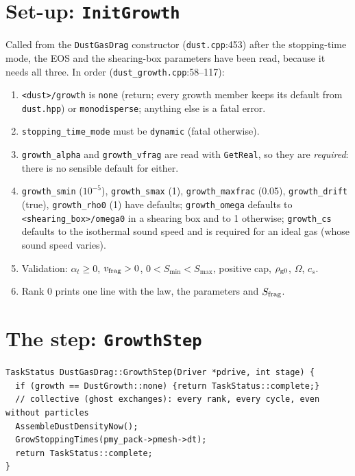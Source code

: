 \documentclass[11pt]{article}
\newcommand{\code}[1]{\texttt{#1}}
\newcommand{\file}[1]{\texttt{\small #1}}
\newcommand{\fn}[1]{\texttt{\small #1}}
\newcommand{\St}{S}
\newcommand{\vf}{v_{\rm frag}}
\begin{document}
\section{Set-up: \fn{InitGrowth}}\label{sec:init}
Called from the \code{DustGasDrag} constructor (\file{dust.cpp}:453) after the
stopping-time mode, the EOS and the shearing-box parameters have been read, because it
needs all three. In order (\file{dust\_growth.cpp}:58--117):
\begin{enumerate}
\item \code{<dust>/growth} is \code{none} (return; every growth member keeps its default
  from \file{dust.hpp}) or \code{monodisperse}; anything else is a fatal error.
\item \code{stopping\_time\_mode} must be \code{dynamic} (fatal otherwise).
\item \code{growth\_alpha} and \code{growth\_vfrag} are read with \fn{GetReal}, so they
  are \emph{required}: there is no sensible default for either.
\item \code{growth\_smin} ($10^{-5}$), \code{growth\_smax} (1), \code{growth\_maxfrac}
  (0.05), \code{growth\_drift} (true), \code{growth\_rho0} (1) have defaults;
  \code{growth\_omega} defaults to \code{<shearing\_box>/omega0} in a shearing box and to
  1 otherwise; \code{growth\_cs} defaults to the isothermal sound speed and is required
  for an ideal gas (whose sound speed varies).
\item Validation: $\alpha_t\ge0$, $\vf>0$, $0<\St_{\min}<\St_{\max}$, positive cap,
  $\rho_{\rm g0}$, $\Omega$, $c_s$.
\item Rank 0 prints one line with the law, the parameters and $\St_{\rm frag}$.
\end{enumerate}

\section{The step: \fn{GrowthStep}}\label{sec:step}
\begin{lstlisting}[firstnumber=125]
TaskStatus DustGasDrag::GrowthStep(Driver *pdrive, int stage) {
  if (growth == DustGrowth::none) {return TaskStatus::complete;}
  // collective (ghost exchanges): every rank, every cycle, even without particles
  AssembleDustDensityNow();
  GrowStoppingTimes(pmy_pack->pmesh->dt);
  return TaskStatus::complete;
}
\end{lstlisting}
\end{document}
